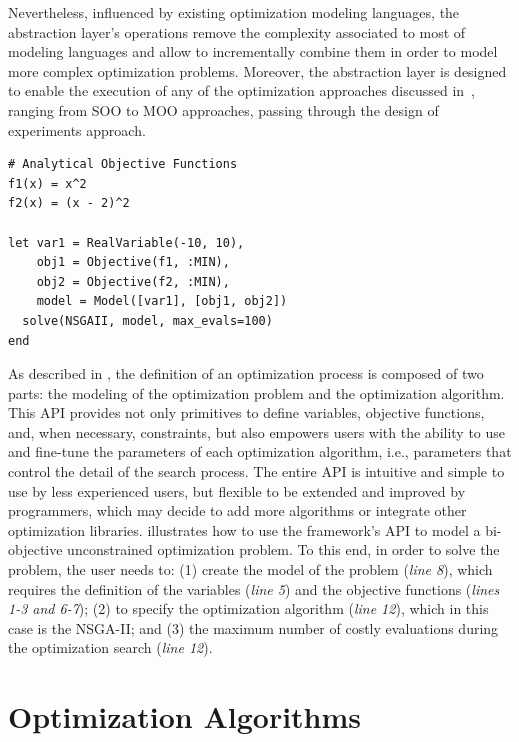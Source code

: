 Nevertheless, influenced by existing optimization modeling languages, the abstraction layer's operations remove the complexity associated to most of modeling languages and allow to incrementally combine them in order to model more complex optimization problems. Moreover, the abstraction layer is designed to enable the execution of any of the optimization approaches discussed in~, ranging from \ac{SOO} to \ac{MOO} approaches, passing through the design of experiments approach.

\begin{lstlisting}[caption={Simple example of the framework's API.},label=juliaCode]
# Analytical Objective Functions
f1(x) = x^2
f2(x) = (x - 2)^2

let var1 = RealVariable(-10, 10),
	obj1 = Objective(f1, :MIN),
	obj2 = Objective(f2, :MIN),
	model = Model([var1], [obj1, obj2])
  solve(NSGAII, model, max_evals=100) 
end
\end{lstlisting}

As described in , the definition of an optimization process is composed of two parts: the modeling of the optimization problem and the optimization algorithm. This \ac{API} provides not only primitives to define variables, objective functions, and, when necessary, constraints, but also empowers users with the ability to use and fine-tune the parameters of each optimization algorithm, i.e., parameters that control the detail of the search process. The entire \ac{API} is intuitive and simple to use by less experienced users, but flexible to be extended and improved by programmers, which may decide to add more algorithms or integrate other optimization libraries.   illustrates how to use the framework's \ac{API} to model a bi-objective unconstrained optimization problem. To this end, in order to solve the problem, the user needs to: (1) create the model of the problem (\textit{line 8}), which requires the definition of the variables (\textit{line 5}) and the objective functions (\textit{lines 1-3 and 6-7}); (2) to specify the optimization algorithm (\textit{line 12}), which in this case is the \ac{NSGA-II}; and (3) the maximum number of costly evaluations during the optimization search (\textit{line 12}).


\section{Optimization Algorithms}
\label{sec:optalgos}

